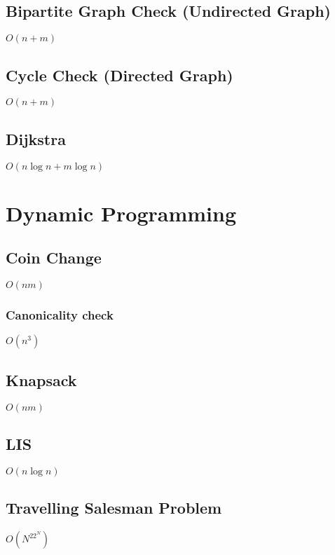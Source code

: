 \documentclass{article}
\begin{document}
\subsection{Bipartite Graph Check (Undirected Graph)}
$O(n+m)$


\subsection{Cycle Check (Directed Graph)}
$O(n+m)$


\subsection{Dijkstra}
$O(n \log n + m\log n)$


\section{Dynamic Programming}
\subsection{Coin Change}
$O(nm)$


\subsubsection{Canonicality check}
$O(n^3)$


\subsection{Knapsack}
$O(nm)$


\subsection{LIS}
$O(n \log n)$


\subsection{Travelling Salesman Problem}
$O(N^22^N)$

\end{document}
